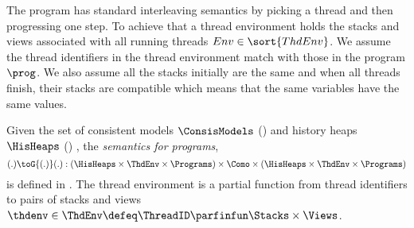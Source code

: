 The program has standard interleaving semantics by picking a thread and then progressing one step.
To achieve that a thread environment holds the stacks and views associated with all running threads \( Env \in \sort{ThdEnv} \).
We assume the thread identifiers in the thread environment match with those in the program \( \prog \).
We also assume all the stacks initially are the same and when all threads finish, their stacks are compatible which means that the same variables have the same values.



\begin{defn} 
\label{def:thread_pool_semantics}
\label{def:program_semantics}
Given the set of consistent models \( \ConsisModels \) () and history heaps \(\HisHeaps\) () , the \emph{semantics for programs}, 
\[
	(.) \toG{(.)} (.): 
    ( \HisHeaps \times \ThdEnv \times \Programs) 
    \times \Como 
    \times ( \HisHeaps \times \ThdEnv \times \Programs) 
\]
is defined in .
The thread environment is a partial function from thread identifiers to pairs of stacks and views \( \thdenv \in \ThdEnv \defeq \ThreadID \parfinfun \Stacks \times \Views \).
\end{defn}
 

